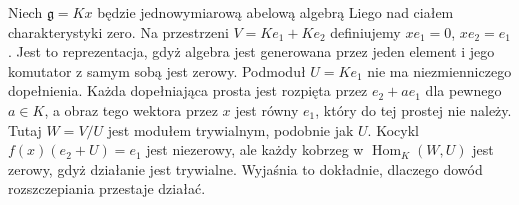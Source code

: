 \begin{przyklad}
\label{aa:prz:weyl-nonsemisimple}
Niech $\mathfrak g=Kx$ będzie jednowymiarową abelową algebrą Liego nad ciałem charakterystyki zero. Na przestrzeni $V=Ke_1+Ke_2$ definiujemy $xe_1=0$, $xe_2=e_1$. Jest to reprezentacja, gdyż algebra jest generowana przez jeden element i jego komutator z samym sobą jest zerowy. Podmoduł $U=Ke_1$ nie ma niezmienniczego dopełnienia. Każda dopełniająca prosta jest rozpięta przez $e_2+ae_1$ dla pewnego $a\in K$, a obraz tego wektora przez $x$ jest równy $e_1$, który do tej prostej nie należy. Tutaj $W=V/U$ jest modułem trywialnym, podobnie jak $U$. Kocykl $f(x)(e_2+U)=e_1$ jest niezerowy, ale każdy kobrzeg w $\operatorname{Hom}_K(W,U)$ jest zerowy, gdyż działanie jest trywialne. Wyjaśnia to dokładnie, dlaczego dowód rozszczepiania przestaje działać.
\end{przyklad}
